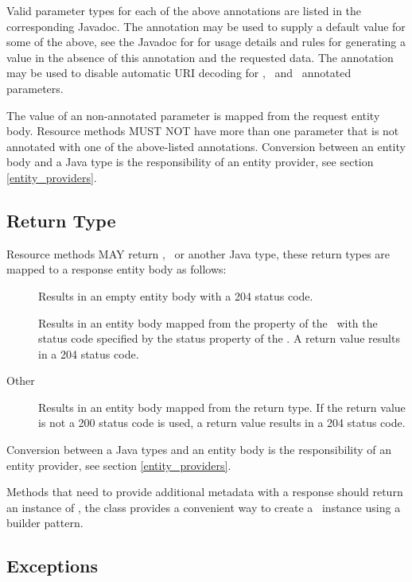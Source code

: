 Valid parameter types for each of the above annotations are listed in the corresponding Javadoc. The  annotation may be used to supply a default value for some of the above, see the Javadoc for  for usage details and rules for generating a value in the absence of this annotation and the requested data. The  annotation may be used to disable automatic URI decoding for \MatrixParam, \QueryParam\ and \PathParam\ annotated parameters.

The value of an non-annotated  parameter is mapped from the request entity body. Resource methods MUST NOT have more than one parameter that is not annotated with one of the above-listed annotations. Conversion between an entity body and a Java type is the responsibility of an entity provider, see section \ref{entity_providers}.

\subsection{Return Type}
\label{resource_method_return}

Resource methods MAY return , \Response\ or another Java type, these return types are mapped to a response entity body as follows:

\begin{description}
\item[] Results in an empty entity body with a 204 status code.
\item[\Response] Results in an entity body mapped from the  property of the \Response\ with the status code specified by the status property of the \Response. A  return value results in a 204 status code.
\item[Other] Results in an entity body mapped from the return type. If the return value is not  a 200 status code is used, a  return value results in a 204 status code.
\end{description}

Conversion between a Java types and an entity body is the responsibility of an entity provider, see section \ref{entity_providers}.

Methods that need to provide additional metadata with a response should return an instance of \Response, the \Response{} class provides a convenient way to create a \Response\ instance using a builder pattern.

\subsection{Exceptions}

